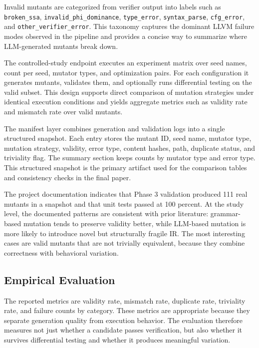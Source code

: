 \documentclass[journal]{IEEEtran}
\begin{document}
Invalid mutants are categorized from verifier output into labels such as \texttt{broken\_ssa}, \texttt{invalid\_phi\_dominance}, \texttt{type\_error}, \texttt{syntax\_parse}, \texttt{cfg\_error}, and \texttt{other\_verifier\_error}. This taxonomy captures the dominant LLVM failure modes observed in the pipeline and provides a concise way to summarize where LLM-generated mutants break down.

The controlled-study endpoint executes an experiment matrix over seed names, count per seed, mutator types, and optimization pairs. For each configuration it generates mutants, validates them, and optionally runs differential testing on the valid subset. This design supports direct comparison of mutation strategies under identical execution conditions and yields aggregate metrics such as validity rate and mismatch rate over valid mutants.

The manifest layer combines generation and validation logs into a single structured snapshot. Each entry stores the mutant ID, seed name, mutator type, mutation strategy, validity, error type, content hashes, path, duplicate status, and triviality flag. The summary section keeps counts by mutator type and error type. This structured snapshot is the primary artifact used for the comparison tables and consistency checks in the final paper.

The project documentation indicates that Phase 3 validation produced 111 real mutants in a snapshot and that unit tests passed at 100 percent. At the study level, the documented patterns are consistent with prior literature: grammar-based mutation tends to preserve validity better, while LLM-based mutation is more likely to introduce novel but structurally fragile IR. The most interesting cases are valid mutants that are not trivially equivalent, because they combine correctness with behavioral variation.

\subsection{Empirical Evaluation}

The reported metrics are validity rate, mismatch rate, duplicate rate, triviality rate, and failure counts by category. These metrics are appropriate because they separate generation quality from execution behavior. The evaluation therefore measures not just whether a candidate passes verification, but also whether it survives differential testing and whether it produces meaningful variation.
\end{document}
